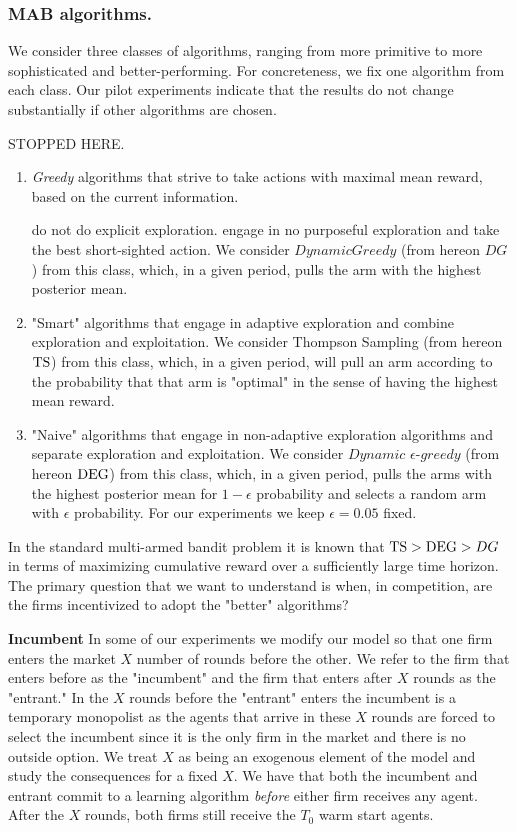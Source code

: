 \documentclass[../competing_bandits.tex]{subfiles}
\begin{document}
\subsubsection{MAB algorithms.} We consider three classes of algorithms, ranging from more primitive to more sophisticated and better-performing. For concreteness, we fix one algorithm from each class. Our pilot experiments indicate that the results do not change substantially if other algorithms are chosen.

STOPPED HERE.

\begin{enumerate}
\item \emph{Greedy} algorithms that strive to take actions with maximal mean reward, based on the current information. 

do not do explicit exploration. engage in no purposeful exploration and take the best short-sighted action. We consider $DynamicGreedy$ (from hereon $DG$) from this class, which, in a given period, pulls the arm with the highest posterior mean.


\item "Smart" algorithms that engage in adaptive exploration and combine exploration and exploitation. We consider Thompson Sampling (from hereon $\mathrm{TS}$) from this class, which, in a given period, will pull an arm according to the probability that that arm is "optimal" in the sense of having the highest mean reward.
\item "Naive" algorithms that engage in non-adaptive exploration algorithms and separate exploration and exploitation. We consider $Dynamic$ $\epsilon$-$greedy$ (from hereon $\mathrm{DEG}$) from this class, which, in a given period, pulls the arms with the highest posterior mean for $1 - \epsilon$ probability and selects a random arm with $\epsilon$ probability. For our experiments we keep $\epsilon = 0.05$ fixed.
\end{enumerate}

In the standard multi-armed bandit problem it is known that $\mathrm{TS} > \mathrm{DEG} > DG$ in terms of maximizing cumulative reward over a sufficiently large time horizon. The primary question that we want to understand is when, in competition, are the firms incentivized to adopt the "better" algorithms?

\noindent \textbf{Incumbent} In some of our experiments we modify our model so that one firm enters the market $X$ number of rounds before the other. We refer to the firm that enters before as the "incumbent" and the firm that enters after $X$ rounds as the "entrant." In the $X$ rounds before the "entrant" enters the incumbent is a temporary monopolist as the agents that arrive in these $X$ rounds are forced to select the incumbent since it is the only firm in the market and there is no outside option. We treat $X$ as being an exogenous element of the model and study the consequences for a fixed $X$. We have that both the incumbent and entrant commit to a learning algorithm \textit{before} either firm receives any agent. After the $X$ rounds, both firms still receive the $T_0$ warm start agents.
\end{document}
